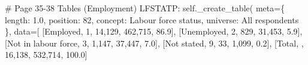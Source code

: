 \documentclass[
  11pt,
  a4paper,
]{article}
\newenvironment{Shaded}{\begin{snugshade}}{\end{snugshade}}
\newcommand{\CommentTok}[1]{\textcolor[rgb]{0.37,0.37,0.37}{#1}}
\newcommand{\NormalTok}[1]{\textcolor[rgb]{0.00,0.23,0.31}{#1}}
\newcommand{\OperatorTok}[1]{\textcolor[rgb]{0.37,0.37,0.37}{#1}}
\newcommand{\StringTok}[1]{\textcolor[rgb]{0.13,0.47,0.30}{#1}}
\newcommand{\VariableTok}[1]{\textcolor[rgb]{0.07,0.07,0.07}{#1}}
\begin{document}
\begin{Shaded}
\begin{Highlighting}[]
            \CommentTok{\# Page 35{-}38 Tables (Employment)}
            \StringTok{\textquotesingle{}LFSTATP\textquotesingle{}}\NormalTok{: }\VariableTok{self}\NormalTok{.\_create\_table(}
\NormalTok{                meta}\OperatorTok{=}\NormalTok{\{}
                    \StringTok{\textquotesingle{}length\textquotesingle{}}\NormalTok{: }\StringTok{\textquotesingle{}1.0\textquotesingle{}}\NormalTok{, }\StringTok{\textquotesingle{}position\textquotesingle{}}\NormalTok{: }\StringTok{\textquotesingle{}82\textquotesingle{}}\NormalTok{,}
                    \StringTok{\textquotesingle{}concept\textquotesingle{}}\NormalTok{: }\StringTok{\textquotesingle{}Labour force status\textquotesingle{}}\NormalTok{,}
                    \StringTok{\textquotesingle{}universe\textquotesingle{}}\NormalTok{: }\StringTok{\textquotesingle{}All respondents\textquotesingle{}}
\NormalTok{                \},}
\NormalTok{                data}\OperatorTok{=}\NormalTok{[}
\NormalTok{                    [}\StringTok{\textquotesingle{}Employed\textquotesingle{}}\NormalTok{, }\StringTok{\textquotesingle{}1\textquotesingle{}}\NormalTok{, }\StringTok{\textquotesingle{}14,129\textquotesingle{}}\NormalTok{, }\StringTok{\textquotesingle{}462,715\textquotesingle{}}\NormalTok{, }\StringTok{\textquotesingle{}86.9\textquotesingle{}}\NormalTok{],}
\NormalTok{                    [}\StringTok{\textquotesingle{}Unemployed\textquotesingle{}}\NormalTok{, }\StringTok{\textquotesingle{}2\textquotesingle{}}\NormalTok{, }\StringTok{\textquotesingle{}829\textquotesingle{}}\NormalTok{, }\StringTok{\textquotesingle{}31,453\textquotesingle{}}\NormalTok{, }\StringTok{\textquotesingle{}5.9\textquotesingle{}}\NormalTok{],}
\NormalTok{                    [}\StringTok{\textquotesingle{}Not in labour force\textquotesingle{}}\NormalTok{, }\StringTok{\textquotesingle{}3\textquotesingle{}}\NormalTok{, }\StringTok{\textquotesingle{}1,147\textquotesingle{}}\NormalTok{, }\StringTok{\textquotesingle{}37,447\textquotesingle{}}\NormalTok{, }\StringTok{\textquotesingle{}7.0\textquotesingle{}}\NormalTok{],}
\NormalTok{                    [}\StringTok{\textquotesingle{}Not stated\textquotesingle{}}\NormalTok{, }\StringTok{\textquotesingle{}9\textquotesingle{}}\NormalTok{, }\StringTok{\textquotesingle{}33\textquotesingle{}}\NormalTok{, }\StringTok{\textquotesingle{}1,099\textquotesingle{}}\NormalTok{, }\StringTok{\textquotesingle{}0.2\textquotesingle{}}\NormalTok{],}
\NormalTok{                    [}\StringTok{\textquotesingle{}Total\textquotesingle{}}\NormalTok{, }\StringTok{\textquotesingle{}\textquotesingle{}}\NormalTok{, }\StringTok{\textquotesingle{}16,138\textquotesingle{}}\NormalTok{, }\StringTok{\textquotesingle{}532,714\textquotesingle{}}\NormalTok{, }\StringTok{\textquotesingle{}100.0\textquotesingle{}}\NormalTok{]}

\end{Highlighting}
\end{Shaded}
\end{document}
